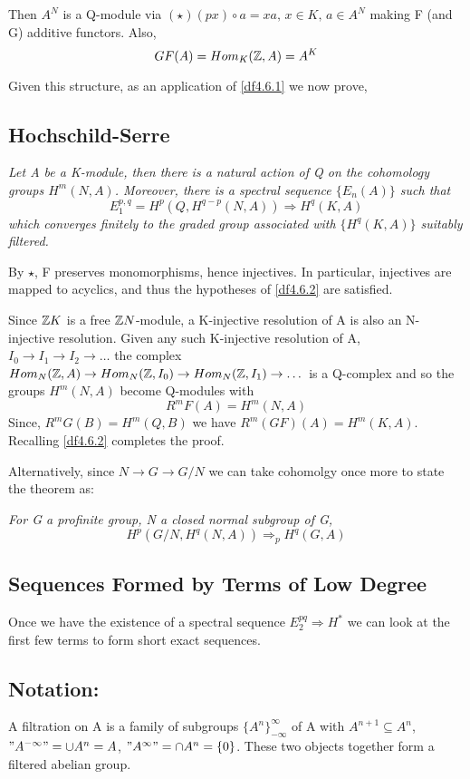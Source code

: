 Then $A^N$ is a Q-module via $(\star ) (px)\circ a = xa,\,x\in K
,\, a\in A^N$ making F (and G) additive functors. Also,
$$GF(A) = Hom_K (\mathbb Z , A) = A^K$$

Given this structure, as an application of \ref{df4.6.1} we now
prove,

\subsection{Hochschild-Serre}\label{df4.6.3}
\emph{Let A be a K-module, then there is a natural action of Q on
the cohomology groups $H^m(N,A)$. Moreover, there is a spectral
sequence $\{E_n(A)\}$ such that
$$E_1^{p,q} = H^p(Q,H^{q-p}(N,A)) \Longrightarrow H^q (K,A)$$
which converges finitely to the graded group associated with $\{
H^q (K,A) \}$ suitably filtered.}

By $\star$, F preserves monomorphisms, hence injectives. In
particular, injectives are mapped to acyclics, and thus the
hypotheses of \ref{df4.6.2} are satisfied.

Since $\mathbb Z K$ is a free $\mathbb Z N$-module, a K-injective resolution of
A is also an N-injective resolution. Given any such K-injective
resolution of A, $I_0\rightarrow I_1\rightarrow I_2\rightarrow
\dots$ the complex $Hom_N(\mathbb Z ,A)\rightarrow Hom_N(\mathbb Z
,I_0)\rightarrow Hom_N(\mathbb Z ,I_1)\rightarrow \dots$ is a Q-complex
and so the groups $H^m(N,A)$ become Q-modules with
$$R^mF(A) = H^m(N,A)$$
Since, $R^mG(B) = H^m(Q,B)$ we have $R^m(GF)(A)=H^m(K,A)$.
Recalling \ref{df4.6.2} completes the proof.

Alternatively, since $N\rightarrow G\rightarrow G/N$ we can take
cohomolgy once more to state the theorem as:

\emph{For G a profinite group, N a closed normal subgroup of G,
$$ H^p(G/N , H^{q}(N,A)) \Longrightarrow_p H^q(G,A)$$}




\subsection{Sequences Formed by Terms of Low
Degree}\label{df4.6.4} Once we have the existence of a spectral
sequence $E_2^{pq} \Longrightarrow H^*$ we can look at the first
few terms to form short exact sequences.

\subsection*{Notation:}
A filtration on A is a family of subgroups ${\{A^n\}
}^\infty_{-\infty}$ of A with $A^{n+1} \subseteq A^n$,
$"A^{-\infty}" = \cup A^n = A$, $"A^\infty" = \cap A^n = \{ 0\} $.
These two objects together form a filtered abelian group.

